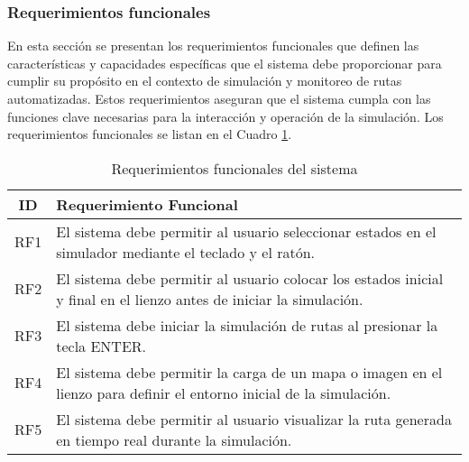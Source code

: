 \subsubsection{Requerimientos funcionales} %

    En esta secci\'on se presentan los requerimientos funcionales que definen las 
        caracter\'isticas y capacidades espec\'ificas que el sistema debe proporcionar 
        para cumplir su prop\'osito en el contexto de simulaci\'on y monitoreo de rutas 
        automatizadas. Estos requerimientos aseguran que el sistema cumpla con las 
        funciones clave necesarias para la interacci\'on y operaci\'on de la simulaci\'on.
        Los requerimientos funcionales se listan en el Cuadro \ref{tab:requerimientos_funcionales}.
    \vskip 0.5cm
    \begin{table}[h!]
        \centering
        \begin{tabular}{|c|p{12cm}|}
        \hline
        \textbf{ID} & \textbf{Requerimiento Funcional} \\
        \hline
        RF1 & El sistema debe permitir al usuario seleccionar estados en el simulador mediante el teclado y el rat\'on. \\
        \hline
        RF2 & El sistema debe permitir al usuario colocar los estados inicial y final en el lienzo antes de iniciar la simulaci\'on. \\
        \hline
        RF3 & El sistema debe iniciar la simulaci\'on de rutas al presionar la tecla ENTER. \\
        \hline
        RF4 & El sistema debe permitir la carga de un mapa o imagen en el lienzo para definir el entorno inicial de la simulaci\'on. \\
        \hline
        RF5 & El sistema debe permitir al usuario visualizar la ruta generada en tiempo real durante la simulaci\'on. \\
        \hline
        \end{tabular}
        \caption{Requerimientos funcionales del sistema}
        \label{tab:requerimientos_funcionales}
    \end{table}